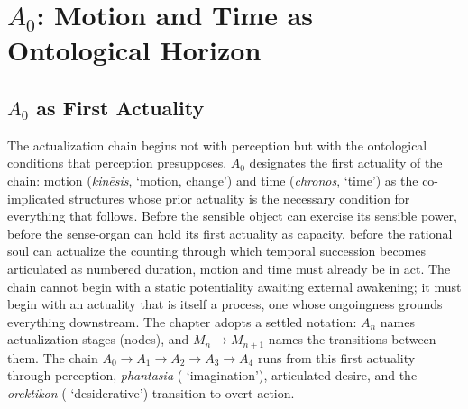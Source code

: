 \section{$A_0$: Motion and Time as Ontological Horizon}

\subsection{$A_0$ as First Actuality}

The actualization chain begins not with perception but with the ontological conditions that perception presupposes. $A_0$ designates the first actuality of the chain: motion (\textit{kinēsis},  `motion, change') and time (\textit{chronos},  `time') as the co-implicated structures whose prior actuality is the necessary condition for everything that follows. Before the sensible object can exercise its sensible power, before the sense-organ can hold its first actuality as capacity, before the rational soul can actualize the counting through which temporal succession becomes articulated as numbered duration, motion and time must already be in act. The chain cannot begin with a static potentiality awaiting external awakening; it must begin with an actuality that is itself a process, one whose ongoingness grounds everything downstream. The chapter adopts a settled notation: $A_n$ names actualization stages (nodes), and $M_n \rightarrow M_{n+1}$ names the transitions between them. The chain $A_0 \rightarrow A_1 \rightarrow A_2 \rightarrow A_3 \rightarrow A_4$ runs from this first actuality through perception, \textit{phantasia} ( `imagination'), articulated desire, and the \textit{orektikon} ( `desiderative') transition to overt action.

